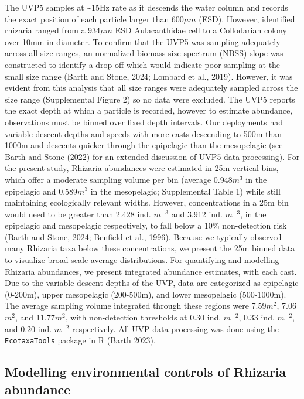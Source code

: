 \documentclass[
]{article}
\begin{document}
The UVP5 samples at \textasciitilde15Hz rate as it descends the water
column and records the exact position of each particle larger than
600\(\mu m\) (ESD). However, identified rhizaria ranged from a
934\(\mu m\) ESD Aulacanthidae cell to a Collodarian colony over 10mm in
diameter. To confirm that the UVP5 was sampling adequately across all
size ranges, an normalized biomass size spectrum (NBSS) slope was
constructed to identify a drop-off which would indicate poor-sampling at
the small size range (Barth and Stone, 2024; Lombard et al., 2019).
However, it was evident from this analysis that all size ranges were
adequately sampled across the size range (Supplemental Figure 2) so no
data were excluded. The UVP5 reports the exact depth at which a particle
is recorded, however to estimate abundance, observations must be binned
over fixed depth intervals. Our deployments had variable descent depths
and speeds with more casts descending to 500m than 1000m and descents
quicker through the epipelagic than the mesopelagic (see Barth and Stone
(2022) for an extended discussion of UVP5 data processing). For the
present study, Rhizaria abundances were estimated in 25m vertical bins,
which offer a moderate sampling volume per bin (average 0.948\(m^3\) in
the epipelagic and 0.589\(m^3\) in the mesopelagic; Supplemental Table
1) while still maintaining ecologically relevant widths. However,
concentrations in a 25m bin would need to be greater than 2.428 ind.
\(m^{-3}\) and 3.912 ind. \(m^{-3}\), in the epipelagic and mesopelagic
respectively, to fall below a 10\% non-detection risk (Barth and Stone,
2024; Benfield et al., 1996). Because we typically observed many
Rhizaria taxa below these concentrations, we present the 25m binned data
to visualize broad-scale average distributions. For quantifying and
modelling Rhizaria abundances, we present integrated abundance
estimates, with each cast. Due to the variable descent depths of the
UVP, data are categorized as epipelagic (0-200m), upper mesopelagic
(200-500m), and lower mesopelagic (500-1000m). The average sampling
volume integrated through these regions were 7.59\(m^2\), 7.06\(m^2\),
and 11.77\(m^2\), with non-detection thresholds at 0.30 ind. \(m^{-2}\),
0.33 ind. \(m^{-2}\), and 0.20 ind. \(m^{-2}\) respectively. All UVP
data processing was done using the \texttt{EcotaxaTools} package in R
(Barth 2023).

\subsection{Modelling environmental controls of Rhizaria
abundance}\label{modelling-environmental-controls-of-rhizaria-abundance}
\end{document}
